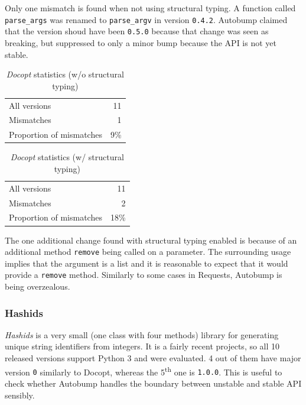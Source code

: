\documentclass{l4proj}
\newcommand\genericstyle{\lstset{basicstyle=\ttm}}
\newcommand\codeinline[1]{{\genericstyle\lstinline!#1!}}
\begin{document}
Only one mismatch is found when not using structural typing. A
function called \codeinline{parse_args} was renamed to
\codeinline{parse_argv} in version \codeinline{0.4.2}. Autobump
claimed that the version shoud have been \codeinline{0.5.0} because
that change was seen as breaking, but suppressed to only a minor bump
because the API is not yet stable.

\noindent
\begin{minipage}[t]{0.5\textwidth}
\begin{table}[H]
\centering
\begin{tabular}{|lr|}
All versions & 11 \\
Mismatches & 1 \\
Proportion of mismatches & 9\% \\
\end{tabular}
\caption{\textit{Docopt} statistics (w/o structural typing)}
\label{DocoptNonStructural}
\end{table}
\end{minipage}
\begin{minipage}[t]{0.5\textwidth}
\begin{table}[H]
\centering
\begin{tabular}{|lr|}
All versions & 11 \\
Mismatches & 2 \\
Proportion of mismatches & 18\% \\
\end{tabular}
\caption{\textit{Docopt} statistics (w/ structural typing)}
\label{DocoptStructural}
\end{table}
\end{minipage}

The one additional change found with structural typing enabled is
because of an additional method \codeinline{remove} being called on a
parameter. The surrounding usage implies that the argument is a list
and it is reasonable to expect that it would provide a
\codeinline{remove} method. Similarly to some cases in
Requests, Autobump is being overzealous.

\subsubsection{Hashids}

\textit{Hashids} \cite{Hashids} is a very small (one class with four
methods) library for generating unique string identifiers from
integers. It is a fairly recent projects, so all 10 released versions
support Python 3 and were evaluated. 4 out of them have major version
\codeinline{0} similarly to Docopt, whereas the 5\textsuperscript{th}
one is \codeinline{1.0.0}. This is useful to check whether Autobump
handles the boundary between unstable and stable API sensibly.
\end{document}
